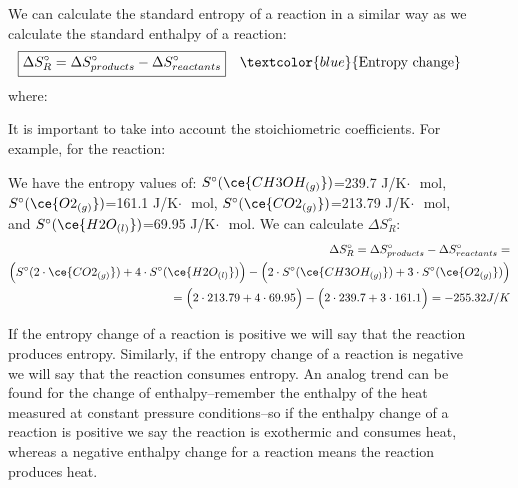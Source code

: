 \documentclass[main.tex]{subfiles}
\newcommand\chapterlabel{entropy}
\begin{document}
\begin{description}
 
 
 
\item[]
We can calculate the standard entropy of a reaction in a similar way as we calculate the standard enthalpy of a reaction:
\begin{equation}\begin{split}
\boxed{  \Delta S^{\circ}_R=\Delta S^{\circ}_{products}-\Delta S^{\circ}_{reactants}  } \quad \textcolor{blue}{\text{Entropy change}}\label{\chapterlabel:equation3}
\end{split}\end{equation}
where:
 It is important to take into account the stoichiometric coefficients. For example, for the reaction:
 \begin{center} \end{center}  
We have the entropy values of: 
$S^{\circ}(\ce{CH3OH_{(g)}})$=239.7 J/K$\cdot \text{ }$mol, $S^{\circ}(\ce{O2_{(g)}})$=161.1 J/K$\cdot \text{ }$mol, $S^{\circ}(\ce{CO2_{(g)}})$=213.79  J/K$\cdot \text{ }$mol, and $S^{\circ}(\ce{H2O_{(l)}})$=69.95  J/K$\cdot \text{ }$mol. We can calculate $\Delta S^{\circ}_R$:
\begin{equation*}\begin{split}
  \Delta S^{\circ}_R= \Delta S^{\circ}_{products}-\Delta S^{\circ}_{reactants}=\\ \Big(S^{\circ}(2\cdot \ce{CO2_{(g)}})   + 4\cdot S^{\circ}(\ce{H2O_{(l)}}) \Big)-\Big(2\cdot S^{\circ}(\ce{CH3OH_{(g)}})+ 3\cdot S^{\circ}(\ce{O2_{(g)}}) \Big)      \\
  =     \Big(2\cdot 213.79  + 4\cdot 69.95\Big)-\Big(2\cdot 239.7 + 3\cdot 161.1 \Big)= -255.32 J/K
\end{split}\end{equation*}

\item[]
If the entropy change of a reaction is positive we will say that the reaction produces entropy. Similarly, if the entropy change of a reaction is negative we will say that the reaction consumes entropy. An analog trend can be found for the change of enthalpy--remember the enthalpy of the heat measured at constant pressure conditions--so if the enthalpy change of a reaction is positive we say the reaction is exothermic and consumes heat, whereas a negative enthalpy change for a reaction means the reaction produces heat.


\end{description}
\end{document}
